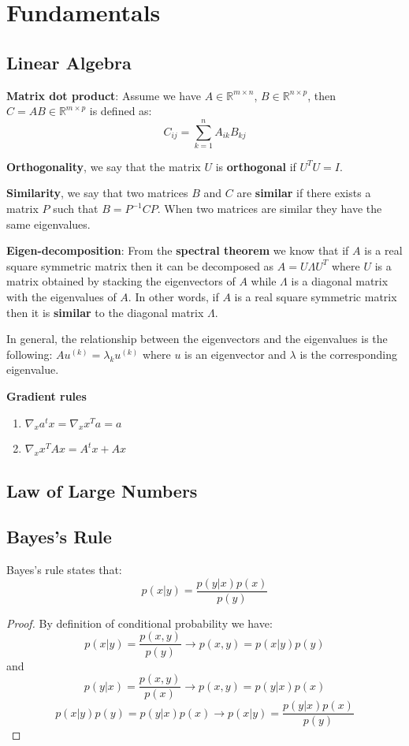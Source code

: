 \chapter{Fundamentals}
\section{Linear Algebra}
\textbf{Matrix dot product}: Assume we have $A \in \mathbb{R}^{m \times n}$, $B \in \mathbb{R}^{n \times p}$, then $C = A B \in \mathbb{R}^{m \times p}$ is defined as:
\[
    C_{ij} = \sum_{k = 1}^{n} A_{ik} B_{kj}
\]

\textbf{Orthogonality}, we say that the matrix $U$ is \textbf{orthogonal} if $U^T U = I$.

\textbf{Similarity}, we say that two matrices $B$ and $C$ are \textbf{similar} if there exists a matrix $P$ such that $B = P^{-1} C P$. When two matrices are similar they have the same eigenvalues.

\textbf{Eigen-decomposition}: From the \textbf{spectral theorem} we know that if $A$ is a real square symmetric matrix then it can be decomposed as $A = U \Lambda U^T$ where $U$ is a matrix obtained by stacking the eigenvectors of $A$ while $\Lambda$ is a diagonal matrix with the eigenvalues of $A$. In other words, if $A$ is a real square symmetric matrix then it is \textbf{similar} to the diagonal matrix $\Lambda$.

In general, the relationship between the eigenvectors and the eigenvalues is the following: $A u^{(k)} = \lambda_k u^{(k)}$ where $u$ is an eigenvector and $\lambda$ is the corresponding eigenvalue.

\textbf{Gradient rules}
\begin{enumerate}
    \item $\nabla_x a^t x = \nabla_x x^T a =  a$
    \item $\nabla_x x^T A x = A^t x + A x$
\end{enumerate}

\section{Law of Large Numbers}

\section{Bayes's Rule}
\begin{theorem}
    Bayes's rule states that:
    \[
        p(x|y) = \frac{p(y|x) p(x)}{p(y)}
    \]
\end{theorem}
\begin{proof}
    By definition of conditional probability we have:
    \[
        p(x|y) = \frac{p(x,y)}{p(y)} \to p(x,y) = p(x|y) p(y)
    \]
    and
    \[
        p(y|x) = \frac{p(x,y)}{p(x)} \to p(x,y) = p(y|x) p(x)
    \]
    \[
        p(x|y) p(y) = p(y|x) p(x) \to p(x|y) = \frac{p(y|x) p(x)}{p(y)}
    \]
\end{proof}

